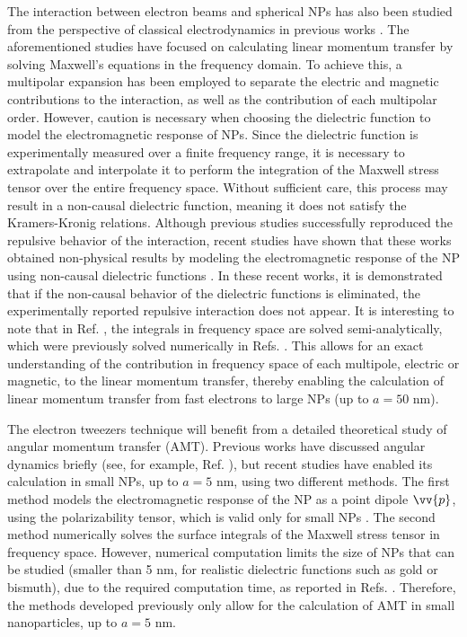 The interaction between electron beams and spherical NPs has also been studied from the perspective of classical electrodynamics in previous works \cite{GarciadeAbajo0, PRBCoronado, Lagos2, Batson2, xu2010transmission}. The aforementioned studies have focused on calculating linear momentum transfer by solving Maxwell's equations in the frequency domain. To achieve this, a multipolar expansion has been employed to separate the electric and magnetic contributions to the interaction, as well as the contribution of each multipolar order. However, caution is necessary when choosing the dielectric function to model the electromagnetic response of NPs. Since the dielectric function is experimentally measured over a finite frequency range, it is necessary to extrapolate and interpolate it to perform the integration of the Maxwell stress tensor over the entire frequency space. Without sufficient care, this process may result in a non-causal dielectric function, meaning it does not satisfy the Kramers-Kronig relations. Although previous studies \cite{GarciadeAbajo0, PRBCoronado, Lagos2, Batson2, xu2010transmission} successfully reproduced the repulsive behavior of the interaction, recent studies have shown that these works obtained non-physical results by modeling the electromagnetic response of the NP using non-causal dielectric functions \cite{castrejon2021effects, castrejon2021phdthesis}. In these recent works, it is demonstrated that if the non-causal behavior of the dielectric functions is eliminated, the experimentally reported repulsive interaction does not appear. It is interesting to note that in Ref. \cite{castrejon2021phdthesis}, the integrals in frequency space are solved semi-analytically, which were previously solved numerically in Refs. \cite{GarciadeAbajo0, PRBCoronado, Lagos2, Batson2, xu2010transmission}. This allows for an exact understanding of the contribution in frequency space of each multipole, electric or magnetic, to the linear momentum transfer, thereby enabling the calculation of linear momentum transfer from fast electrons to large NPs (up to $a=50$ nm).

The electron tweezers technique will benefit from a detailed theoretical study of angular momentum transfer (AMT). Previous works have discussed angular dynamics briefly (see, for example, Ref. \cite{GarciadeAbajo-1}), but recent studies have enabled its calculation in small NPs, up to $a=5$ nm, using two different methods. The first method models the electromagnetic response of the NP as a point dipole $\vv{p}$, using the polarizability tensor, which is valid only for small NPs \cite{castellanos2021angular}. The second method numerically solves the surface integrals of the Maxwell stress tensor \cite{castellanos2023theory, castellanos2021phdthesis} in frequency space. However, numerical computation limits the size of NPs that can be studied (smaller than 5 nm, for realistic dielectric functions such as gold or bismuth), due to the required computation time, as reported in Refs. \cite{castellanos2021phdthesis, castellanos2023theory}. Therefore, the methods developed previously only allow for the calculation of AMT in small nanoparticles, up to $a=5$ nm.



